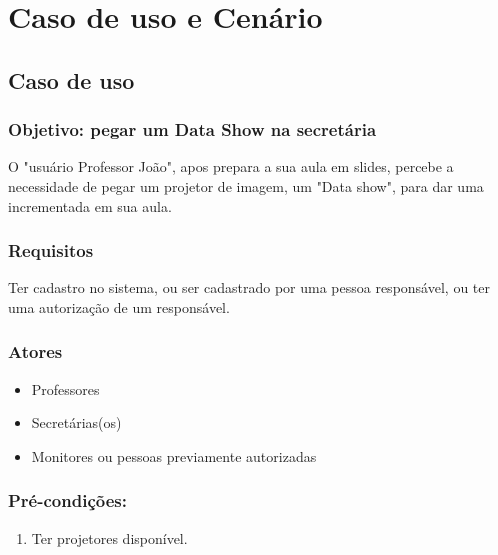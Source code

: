 \section{Caso de uso e Cenário}  

\subsection{Caso de uso}

\subsubsection{Objetivo: pegar um Data Show na secretária}

O "usuário Professor João", apos prepara a sua aula em slides, percebe a necessidade de pegar um projetor 
de imagem, um "Data show", para dar uma incrementada em sua aula. 

\subsubsection{Requisitos}

Ter cadastro no sistema, ou ser cadastrado por uma pessoa responsável, ou ter uma autorização de um responsável. 


\subsubsection{Atores}

\begin{itemize}

  \item Professores 

  \item Secretárias(os)

  \item Monitores ou pessoas previamente autorizadas

\end{itemize}


\subsubsection{Pré-condições:}

\begin{enumerate}

  \item Ter projetores disponível. 

\end{enumerate}


